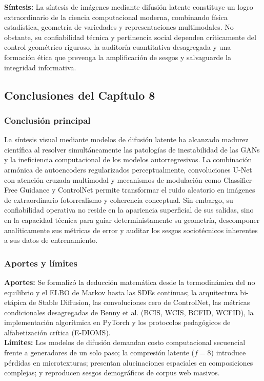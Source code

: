 \vspace{0.3cm}
\begin{cajabeige}
\textbf{Síntesis:} La síntesis de imágenes mediante difusión latente constituye un logro extraordinario de la ciencia computacional moderna, combinando física estadística, geometría de variedades y representaciones multimodales. No obstante, su confiabilidad técnica y pertinencia social dependen críticamente del control geométrico riguroso, la auditoría cuantitativa desagregada y una formación ética que prevenga la amplificación de sesgos y salvaguarde la integridad informativa.
\end{cajabeige}

\newpage
{}
\subsection*{Conclusiones del Capítulo 8}

\subsubsection*{Conclusión principal}
La síntesis visual mediante modelos de difusión latente ha alcanzado madurez científica al resolver simultáneamente las patologías de inestabilidad de las GANs y la ineficiencia computacional de los modelos autorregresivos. La combinación armónica de autoencoders regularizados perceptualmente, convoluciones U-Net con atención cruzada multimodal y mecanismos de modulación como Classifier-Free Guidance y ControlNet permite transformar el ruido aleatorio en imágenes de extraordinario fotorrealismo y coherencia conceptual. Sin embargo, su confiabilidad operativa no reside en la apariencia superficial de sus salidas, sino en la capacidad técnica para guiar deterministamente su geometría, descomponer analíticamente sus métricas de error y auditar los sesgos sociotécnicos inherentes a sus datos de entrenamiento.

\subsubsection*{Aportes y límites}
\textbf{Aportes:} Se formalizó la deducción matemática desde la termodinámica del no equilibrio y el ELBO de Markov hasta las SDEs continuas; la arquitectura bi-etápica de Stable Diffusion, las convoluciones cero de ControlNet, las métricas condicionales desagregadas de Benny et al. (BCIS, WCIS, BCFID, WCFID), la implementación algorítmica en PyTorch y los protocolos pedagógicos de alfabetización crítica (E-DIOMS).\\[0.1cm]
\textbf{Límites:} Los modelos de difusión demandan costo computacional secuencial frente a generadores de un solo paso; la compresión latente ($f=8$) introduce pérdidas en microtexturas; presentan alucinaciones espaciales en composiciones complejas; y reproducen sesgos demográficos de corpus web masivos.

